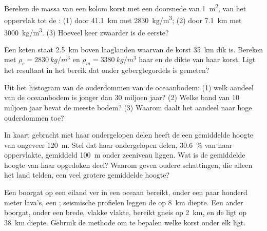 \begin{exercise}[$\star\star$]\label{exo:g12:continental-crust:7}
Bereken de massa van een kolom korst met een doorsnede van \qty{1}{m^2},
van het oppervlak tot de : (1) door \qty{41.1}{km}  met \qty{2830}{kg/m^3}; (2) door \qty{7.1}{km}  met
\qty{3000}{kg/m^3}. (3) Hoeveel keer zwaarder is de eerste?
\end{exercise}

\begin{exercise}[$\star\star$]\label{exo:g12:continental-crust:8}
Een keten staat \qty{2.5}{km} boven laaglanden waarvan de korst \qty{35}{km}
dik is. Bereken met $\rho_c = \qty{2830}{kg/m^3}$ en $\rho_m =
\qty{3380}{kg/m^3}$ haar  en de dikte van haar korst. Ligt
het resultaat in het bereik dat onder gebergtegordels is gemeten?
\end{exercise}

\begin{exercise}[$\star\star$]\label{exo:g12:continental-crust:9}
Uit het histogram van de ouderdommen van de oceaanbodem: (1) welk aandeel van de oceaanbodem is
jonger dan 30 miljoen jaar? (2) Welke band van 10 miljoen jaar bevat de
meeste bodem? (3) Waarom daalt het aandeel naar hoge ouderdommen toe?
\end{exercise}

\begin{exercise}[$\star\star$]\label{exo:g12:continental-crust:10}
In kaart gebracht met haar ondergelopen delen heeft de  een gemiddelde hoogte van
ongeveer \qty{120}{m}. Stel dat haar ondergelopen delen, \qty{30.6}{\percent} van haar
oppervlakte, gemiddeld \qty{100}{m} onder zeeniveau liggen. Wat is de gemiddelde hoogte van
haar opgedoken deel? Waarom geven oudere schattingen, die alleen het land telden, een
veel grotere gemiddelde hoogte?
\end{exercise}

\begin{exercise}[$\star\star$]\label{exo:g12:continental-crust:11}
Een boorgat op een eiland ver in een oceaan bereikt, onder een paar honderd
meter lava's, een ; seismische profielen leggen de  op \qty{8}{km} diepte.
Een ander boorgat, onder een brede, vlakke vlakte, bereikt gneis op \qty{2}{km},
en de  ligt op \qty{38}{km} diepte. Gebruik de methode om te bepalen welke korst
onder elk ligt.
\end{exercise}

